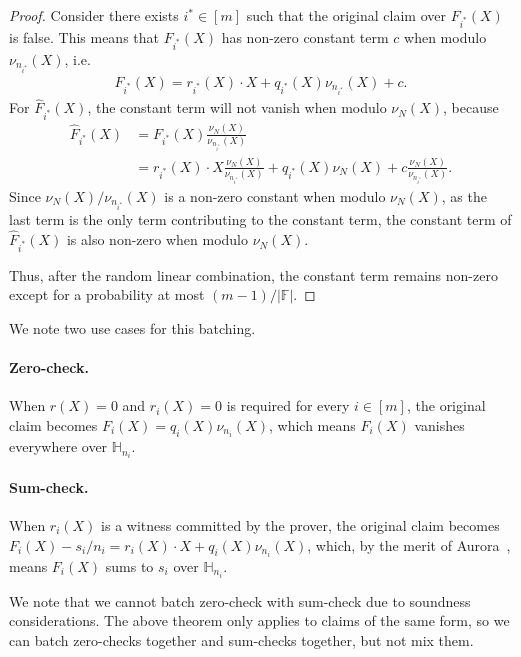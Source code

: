 \begin{proof}
Consider there exists $i^*\in [m]$ such that the original
  claim over $F_{i^*}(X)$ is false. 
  This means that $F_{i^*}(X)$ has non-zero
  constant term $c$ when modulo $\nu_{n_{i^*}}(X)$, i.e.
  \begin{align}
    F_{i^*}(X) = r_{i^*}(X)\cdot X + q_{i^*}(X)\nu_{n_{i^*}}(X) + c.
  \end{align}
  For $\widehat{F}_{i^*}(X)$, the constant term will not vanish
  when modulo $\nu_N(X)$, because
  \begin{align}
    \widehat{F}_{i^*}(X) &= F_{i^*}(X)\frac{\nu_N(X)}{\nu_{n_{i^*}}(X)}\\
    &= r_{i^*}(X)\cdot X\frac{\nu_N(X)}{\nu_{n_{i^*}}(X)} + q_{i^*}(X)\nu_N(X) + c\frac{\nu_N(X)}{\nu_{n_{i^*}}(X)}.
  \end{align}
  Since $\nu_N(X)/\nu_{n_{i^*}}(X)$ is a non-zero constant when modulo $\nu_N(X)$, as the last term is the only term contributing to the constant term,
  the constant term of $\widehat{F}_{i^*}(X)$ is also non-zero when modulo $\nu_N(X)$.

Thus, after the random linear combination,
  the constant term remains non-zero except for a probability at most $(m-1)/|\mathbb{F}|$.
\end{proof}

We note two use cases for this batching.

\paragraph{Zero-check.} When $r(X) = 0$ and $r_i(X) = 0$ is required for every $i\in [m]$, the original
claim becomes $F_i(X) = q_i(X)\nu_{n_i}(X)$, which means
$F_i(X)$ vanishes everywhere over $\mathbb{H}_{n_i}$.

\paragraph{Sum-check.} When $r_i(X)$ is a witness committed by the prover,
the original claim becomes $F_i(X) - s_i/n_i = r_i(X)\cdot X + q_i(X)\nu_{n_i}(X)$, which, by the merit of Aurora~\cite{aurora19}, means $F_i(X)$ sums to $s_i$ over $\mathbb{H}_{n_i}$.

We note that we cannot batch zero-check with sum-check due to soundness
considerations. The above theorem only applies to claims of the same form, so we can batch zero-checks together and sum-checks together, but not mix them.


